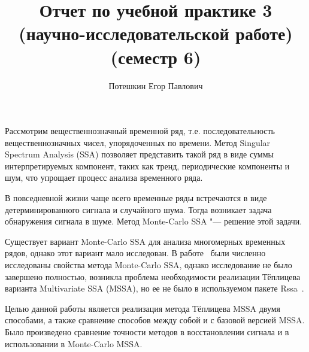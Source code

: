 \documentclass[specialist,
substylefile = spbu_report.rtx,
subf,href,colorlinks=true, 12pt]{disser}
\theoremstyle{definition}
\begin{document}
	
	\title{Отчет по учебной практике 3 (научно-исследовательской работе) (семестр 6)}
	
	
	\author{Потешкин Егор Павлович}
	
	
	\date{\number\year}
	
	\maketitle
	\tableofcontents
	\intro
	Рассмотрим вещественнозначный временной ряд, т.е. последовательность вещественнозначных чисел, упорядоченных по времени. Метод Singular Spectrum Analysis (SSA) позволяет представить такой ряд в виде суммы интерпретируемых компонент, таких как тренд, периодические компоненты и шум, что упрощает процесс анализа временного ряда.
	
	В повседневной жизни чаще всего временные ряды встречаются в виде детерминированного сигнала и случайного шума. Тогда возникает задача обнаружения сигнала в шуме. Метод Monte-Carlo SSA "--- решение этой задачи.  
	
	Существует вариант Monte-Carlo SSA для анализа многомерных временных рядов, однако этот вариант мало исследован. В работе~\cite{Larin_2022} были численно исследованы свойства метода Monte-Carlo SSA, однако исследование не было завершено полностью, возникла проблема необходимости реализации Тёплицева варианта Multivariate SSA (MSSA), но ее не было в используемом пакете Rssa~\cite{Rssa}.
	
	Целью данной работы является реализация метода Тёплицева MSSA двумя способами, а также сравнение способов между собой и с базовой версией MSSA. Было произведено сравнение точности методов в восстановлении сигнала и в использовании в Monte-Carlo MSSA.  
\end{document}
